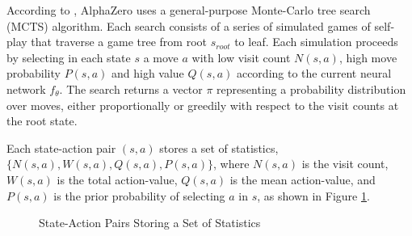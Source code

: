 According to \cite{silver2017masteringchessshogiselfplay}, AlphaZero uses a general-purpose Monte-Carlo tree search (MCTS) algorithm. Each search consists of a series of simulated games of self-play that traverse a game tree from root $s_{root}$ to leaf. Each simulation proceeds by selecting in each state $s$ a move $a$ with low visit count $N(s, a)$, high move probability $P(s,a)$ and high value $Q(s, a)$ according to the current neural network $f_\theta$. The search returns a vector $\pi$ representing a probability distribution over moves, either proportionally or greedily with respect to the visit counts at the root state.

Each state-action pair $(s,a)$ stores a set of statistics, $\{N(s, a), W(s, a), Q(s, a), P(s, a)\}$, where $N(s, a)$ is the visit count, $W(s, a)$ is the total action-value, $Q(s, a)$ is the mean action-value, and $P(s, a)$ is the prior probability of selecting $a$ in $s$, as shown in Figure \ref{fig:game-tree-with-stats}.

\begin{figure}[htb]
    \centering
    \caption{State-Action Pairs Storing a Set of Statistics}
    \label{fig:game-tree-with-stats}
\end{figure}

